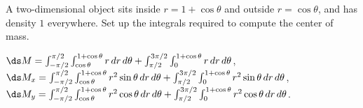 \begin{enumialphparenastyle}
\begin{ex}
A two-dimensional object sits inside $r=1+\cos\theta$
and outside $r=\cos\theta$, and has density $1$ everywhere.
Set up
the integrals required to compute the center of mass.
\begin{sol}
$\ds M= \int_{-\pi/2}^{\pi/2}\int_{\cos\theta}^{1+\cos\theta}
r\,dr\,d\theta + \int_{\pi/2}^{3\pi/2}\int_0^{1+\cos\theta}r\,dr\,d\theta$,
\hfill\break
$\ds M_x=\int_{-\pi/2}^{\pi/2}\int_{\cos\theta}^{1+\cos\theta}
r^2\sin\theta\,dr\,d\theta + \int_{\pi/2}^{3\pi/2}\int_0^{1+\cos\theta}r^2\sin\theta\,dr\,d\theta$,
\hfill\break
$\ds M_y=\int_{-\pi/2}^{\pi/2}\int_{\cos\theta}^{1+\cos\theta}
r^2\cos\theta\,dr\,d\theta + \int_{\pi/2}^{3\pi/2}\int_0^{1+\cos\theta}r^2\cos\theta\,dr\,d\theta$.
\end{sol}
\end{ex}

\end{enumialphparenastyle}